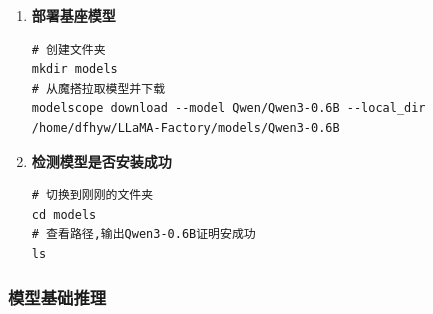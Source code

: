 \documentclass[12pt]{ctexart}
\begin{document}
\begin{enumerate}
    \item \textbf{部署基座模型}

          \begin{lstlisting}
# 创建文件夹
mkdir models
# 从魔搭拉取模型并下载
modelscope download --model Qwen/Qwen3-0.6B --local_dir /home/dfhyw/LLaMA-Factory/models/Qwen3-0.6B
          \end{lstlisting}

    \item \textbf{检测模型是否安装成功}

          \begin{lstlisting}
# 切换到刚刚的文件夹
cd models
# 查看路径,输出Qwen3-0.6B证明安成功
ls
          \end{lstlisting}

\end{enumerate}

\subsubsection{模型基础推理}
\end{document}
